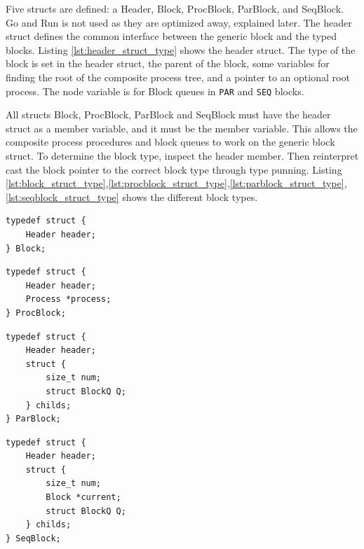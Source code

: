 Five structs are defined: a Header, Block, ProcBlock, ParBlock, and SeqBlock. Go and Run is not used as they are optimized away, explained later. The header struct defines the common interface between the generic block and the typed blocks. Listing \ref{lst:header_struct_type} shows the header struct. The type of the block is set in the header struct, the parent of the block, some variables for finding the root of the composite process tree, and a pointer to an optional root process. The node variable is for Block queues in \texttt{PAR} and \texttt{SEQ} blocks.

All structs Block, ProcBlock, ParBlock and SeqBlock must have the header struct as a member variable, and it must be the \underline{} member variable. This allows the composite process procedures and block queues to work on the generic block struct. To determine the block type, inspect the header member. Then reinterpret cast the block pointer to the correct block type through type punning. Listing \ref{lst:block_struct_type},\ref{lst:procblock_struct_type},\ref{lst:parblock_struct_type},\ref{lst:seqblock_struct_type} shows the different block types.

\noindent\begin{minipage}{.45\textwidth}
\begin{lstlisting}[caption={Generic Block struct type},style={CustomC},label={lst:block_struct_type}]
typedef struct {
    Header header;
} Block;
\end{lstlisting}
\end{minipage}\hfill
\begin{minipage}{.45\textwidth}
\begin{lstlisting}[caption={\texttt{PROC} Block struct type},style={CustomC},label={lst:procblock_struct_type}]
typedef struct {
    Header header;
    Process *process;
} ProcBlock;
\end{lstlisting}
\end{minipage}
\noindent\begin{minipage}{.45\textwidth}
\begin{lstlisting}[caption={\texttt{PAR} Block struct type},style={CustomC},label={lst:parblock_struct_type}]
typedef struct {
    Header header;
    struct {
        size_t num;
        struct BlockQ Q;
    } childs;
} ParBlock;
\end{lstlisting}
\end{minipage}\hfill
\begin{minipage}{.45\textwidth}
\begin{lstlisting}[caption={\texttt{SEQ} Block struct type},style={CustomC},label={lst:seqblock_struct_type}]
typedef struct {
    Header header;
    struct {
        size_t num;
        Block *current;
        struct BlockQ Q;
    } childs;
} SeqBlock;
\end{lstlisting}
\end{minipage}


